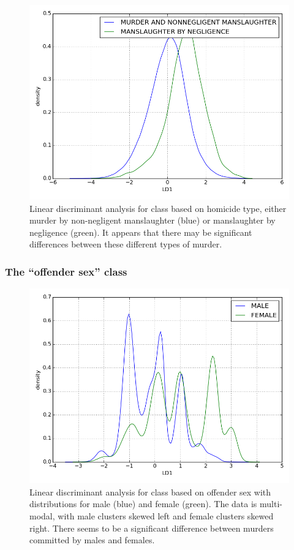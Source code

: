 \begin{multicols}{2}
\begin{figure}[H]
  \centering
    \includegraphics[width=\linewidth]{images/homicide/type.png}
  \caption{Linear discriminant analysis for class based on homicide type, either murder by non-negligent manslaughter (blue) or manslaughter by negligence (green).  It appears that there may be significant differences between these different types of murder.}
\end{figure}

\subsubsection{The ``offender sex'' class}

\begin{figure}[H]
  \centering
    \includegraphics[width=\linewidth]{images/offn_sex/offn_sex.png}
  \caption{Linear discriminant analysis for class based on offender sex with distributions for male (blue) and female (green).  The data is multi-modal, with male clusters skewed left and female clusters skewed right.  There seems to be a significant difference between murders committed by males and females.}
\end{figure}


\end{multicols}
